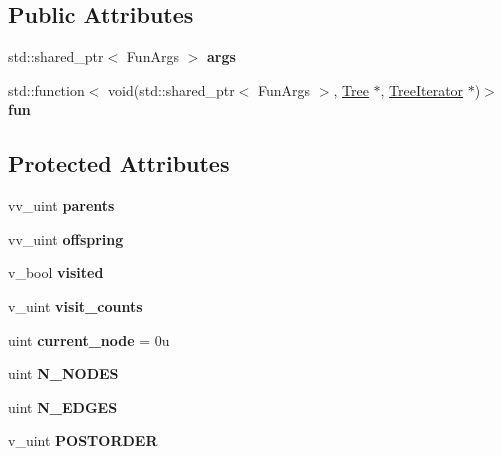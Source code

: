 \subsection*{Public Attributes}
\begin{DoxyCompactItemize}
\item 
std\+::shared\+\_\+ptr$<$ Fun\+Args $>$ {\bfseries args}\hypertarget{classTree_ab9e870a9889c897bb6164eed1047b5eb}{}\label{classTree_ab9e870a9889c897bb6164eed1047b5eb}

\item 
std\+::function$<$ void(std\+::shared\+\_\+ptr$<$ Fun\+Args $>$, \hyperlink{classTree}{Tree} $\ast$, \hyperlink{classTreeIterator}{Tree\+Iterator} $\ast$)$>$ {\bfseries fun}\hypertarget{classTree_aed3ea5ee55cf81fca64812e34a5050de}{}\label{classTree_aed3ea5ee55cf81fca64812e34a5050de}

\end{DoxyCompactItemize}
\subsection*{Protected Attributes}
\begin{DoxyCompactItemize}
\item 
vv\+\_\+uint {\bfseries parents}\hypertarget{classTree_a4d26e079c9d0b250a4bda27de8ad223c}{}\label{classTree_a4d26e079c9d0b250a4bda27de8ad223c}

\item 
vv\+\_\+uint {\bfseries offspring}\hypertarget{classTree_ade5fd3ba5b6480c4edf8590eb0e41e34}{}\label{classTree_ade5fd3ba5b6480c4edf8590eb0e41e34}

\item 
v\+\_\+bool {\bfseries visited}\hypertarget{classTree_a45813764070bd88238a3372c16b423fa}{}\label{classTree_a45813764070bd88238a3372c16b423fa}

\item 
v\+\_\+uint {\bfseries visit\+\_\+counts}\hypertarget{classTree_ac504d0c090c1f76363fc00cff2de0e7f}{}\label{classTree_ac504d0c090c1f76363fc00cff2de0e7f}

\item 
uint {\bfseries current\+\_\+node} = 0u\hypertarget{classTree_a94b6910514cea207bf4b144eeb7d27cf}{}\label{classTree_a94b6910514cea207bf4b144eeb7d27cf}

\item 
uint {\bfseries N\+\_\+\+N\+O\+D\+ES}\hypertarget{classTree_a41b7a5ddd47b82688c099ee47561eb4f}{}\label{classTree_a41b7a5ddd47b82688c099ee47561eb4f}

\item 
uint {\bfseries N\+\_\+\+E\+D\+G\+ES}\hypertarget{classTree_a123cdf871af449443aa8b7c05029d72a}{}\label{classTree_a123cdf871af449443aa8b7c05029d72a}

\item 
v\+\_\+uint {\bfseries P\+O\+S\+T\+O\+R\+D\+ER}\hypertarget{classTree_a310e76b803db38e7067514822b21a58f}{}\label{classTree_a310e76b803db38e7067514822b21a58f}

\end{DoxyCompactItemize}
